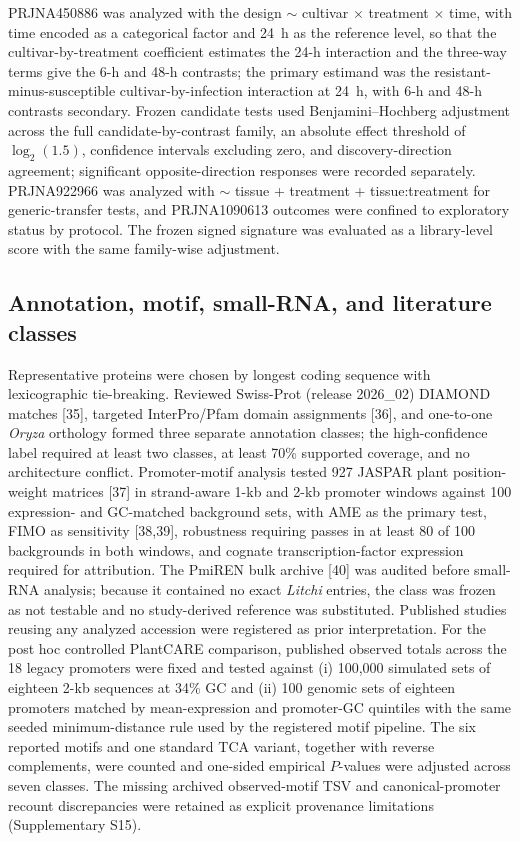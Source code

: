 \documentclass[referee,pdflatex,sn-basic,Numbered]{sn-jnl}
\begin{document}
PRJNA450886 was analyzed with the design $\sim$ cultivar $\times$ treatment $\times$ time, with time encoded as a categorical factor and 24~h as the reference level, so that the cultivar-by-treatment coefficient estimates the 24-h interaction and the three-way terms give the 6-h and 48-h contrasts; the primary estimand was the resistant-minus-susceptible cultivar-by-infection interaction at 24~h, with 6-h and 48-h contrasts secondary. Frozen candidate tests used Benjamini--Hochberg adjustment across the full candidate-by-contrast family, an absolute effect threshold of $\log_2(1.5)$, confidence intervals excluding zero, and discovery-direction agreement; significant opposite-direction responses were recorded separately. PRJNA922966 was analyzed with $\sim$ tissue + treatment + tissue:treatment for generic-transfer tests, and PRJNA1090613 outcomes were confined to exploratory status by protocol. The frozen signed signature was evaluated as a library-level score with the same family-wise adjustment.

\subsection{Annotation, motif, small-RNA, and literature classes}

Representative proteins were chosen by longest coding sequence with lexicographic tie-breaking. Reviewed Swiss-Prot (release 2026\_02) DIAMOND matches [35], targeted InterPro/Pfam domain assignments [36], and one-to-one \textit{Oryza} orthology formed three separate annotation classes; the high-confidence label required at least two classes, at least 70\% supported coverage, and no architecture conflict. Promoter-motif analysis tested 927 JASPAR plant position-weight matrices [37] in strand-aware 1-kb and 2-kb promoter windows against 100 expression- and GC-matched background sets, with AME as the primary test, FIMO as sensitivity [38,39], robustness requiring passes in at least 80 of 100 backgrounds in both windows, and cognate transcription-factor expression required for attribution. The PmiREN bulk archive [40] was audited before small-RNA analysis; because it contained no exact \textit{Litchi} entries, the class was frozen as not testable and no study-derived reference was substituted. Published studies reusing any analyzed accession were registered as prior interpretation. For the post hoc controlled PlantCARE comparison, published observed totals across the 18 legacy promoters were fixed and tested against (i) 100,000 simulated sets of eighteen 2-kb sequences at 34\% GC and (ii) 100 genomic sets of eighteen promoters matched by mean-expression and promoter-GC quintiles with the same seeded minimum-distance rule used by the registered motif pipeline. The six reported motifs and one standard TCA variant, together with reverse complements, were counted and one-sided empirical $P$-values were adjusted across seven classes. The missing archived observed-motif TSV and canonical-promoter recount discrepancies were retained as explicit provenance limitations (Supplementary S15).
\end{document}
